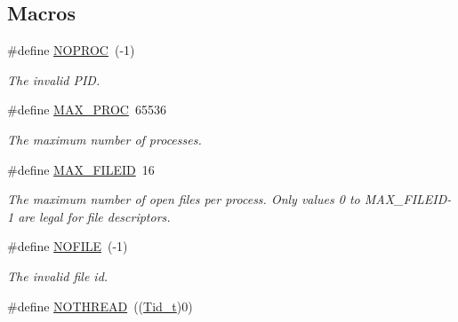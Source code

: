 \subsection*{Macros}
\begin{DoxyCompactItemize}
\item 
\hypertarget{group__syscalls_gaf22d54bd4d558803b5ccbc6eb21f83b2}{\#define \hyperlink{group__syscalls_gaf22d54bd4d558803b5ccbc6eb21f83b2}{N\-O\-P\-R\-O\-C}~(-\/1)}\label{group__syscalls_gaf22d54bd4d558803b5ccbc6eb21f83b2}

\begin{DoxyCompactList}\small\item\em The invalid P\-I\-D. \end{DoxyCompactList}\item 
\hypertarget{group__syscalls_ga63e32d00bc48471b4db49d481ac228dc}{\#define \hyperlink{group__syscalls_ga63e32d00bc48471b4db49d481ac228dc}{M\-A\-X\-\_\-\-P\-R\-O\-C}~65536}\label{group__syscalls_ga63e32d00bc48471b4db49d481ac228dc}

\begin{DoxyCompactList}\small\item\em The maximum number of processes. \end{DoxyCompactList}\item 
\hypertarget{group__syscalls_ga9c697bf9e856897ad75f28190a6f0b68}{\#define \hyperlink{group__syscalls_ga9c697bf9e856897ad75f28190a6f0b68}{M\-A\-X\-\_\-\-F\-I\-L\-E\-I\-D}~16}\label{group__syscalls_ga9c697bf9e856897ad75f28190a6f0b68}

\begin{DoxyCompactList}\small\item\em The maximum number of open files per process. Only values 0 to M\-A\-X\-\_\-\-F\-I\-L\-E\-I\-D-\/1 are legal for file descriptors. \end{DoxyCompactList}\item 
\hypertarget{group__syscalls_ga80bacbaea8dd6aecf216d85d981bcb21}{\#define \hyperlink{group__syscalls_ga80bacbaea8dd6aecf216d85d981bcb21}{N\-O\-F\-I\-L\-E}~(-\/1)}\label{group__syscalls_ga80bacbaea8dd6aecf216d85d981bcb21}

\begin{DoxyCompactList}\small\item\em The invalid file id. \end{DoxyCompactList}\item 
\hypertarget{group__syscalls_ga00ccfb785dd0b09ec7091fc213c2f491}{\#define \hyperlink{group__syscalls_ga00ccfb785dd0b09ec7091fc213c2f491}{N\-O\-T\-H\-R\-E\-A\-D}~((\hyperlink{group__syscalls_gaf67ad1c55e6b2a79bf8a99106380ce01}{Tid\-\_\-t})0)}\label{group__syscalls_ga00ccfb785dd0b09ec7091fc213c2f491}


\end{DoxyCompactItemize}
